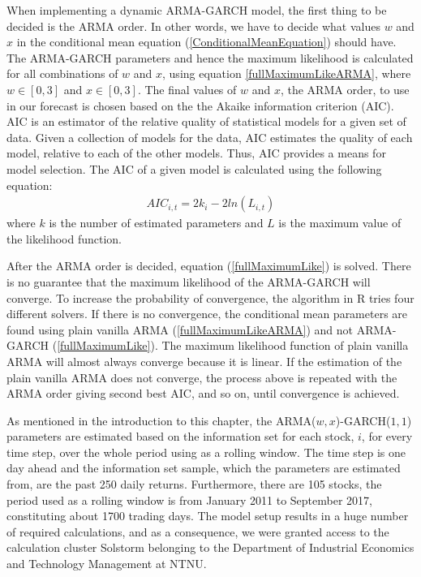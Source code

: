 When implementing a dynamic ARMA-GARCH model, the first thing to be decided is the ARMA order. In other words, we have to decide what values $w$ and $x$ in the conditional mean equation (\ref{ConditionalMeanEquation}) should have. The ARMA-GARCH parameters and hence the maximum likelihood is calculated for all combinations of $w$ and $x$, using equation \ref{fullMaximumLikeARMA}, where $w\in[0,3]$ and $x\in[0,3]$. The final values of $w$ and $x$, the ARMA order, to use in our forecast is chosen based on the the Akaike information criterion (AIC). AIC is an estimator of the relative quality of statistical models for a given set of data. Given a collection of models for the data, AIC estimates the quality of each model, relative to each of the other models. Thus, AIC provides a means for model selection. The AIC of a given model is calculated using the following equation:
\begin{align}
    AIC_{i,t}=2k_i-2ln(L_{i,t})
\end{align}
where $k$ is the number of estimated parameters and $L$ is the maximum value of the likelihood function. 

After the ARMA order is decided, equation (\ref{fullMaximumLike}) is solved. There is no guarantee that the maximum likelihood of the ARMA-GARCH will converge. To increase the probability of convergence, the algorithm in R tries four different solvers. If there is no convergence, the conditional mean parameters are found using plain vanilla ARMA (\ref{fullMaximumLikeARMA}) and not ARMA-GARCH (\ref{fullMaximumLike}). The maximum likelihood function of plain vanilla ARMA will almost always converge because it is linear. If the estimation of the plain vanilla ARMA does not converge, the process above is repeated with the ARMA order giving second best AIC, and so on, until convergence is achieved.

As mentioned in the introduction to this chapter, the ARMA($w,x$)-GARCH($1,1$) parameters are estimated based on the information set for each stock, $i$, for every time step, over the whole period using as a rolling window. The time step is one day ahead and the information set sample, which the parameters are estimated from, are the past 250 daily returns. Furthermore, there are 105 stocks, the period used as a rolling window is from January 2011 to September 2017, constituting about 1700 trading days. The model setup results in a huge number of required calculations, and as a consequence, we were granted access to the calculation cluster Solstorm belonging to the Department of Industrial Economics and Technology Management at NTNU. 


